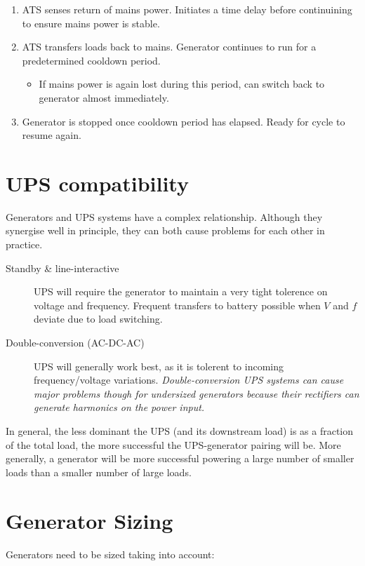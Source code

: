 \documentclass{pgnotes}
\begin{document}
\begin{enumerate}
\item ATS senses return of mains power. Initiates a time delay before continuining to ensure mains power is stable.
\item ATS transfers loads back to mains. Generator continues to run for a predetermined cooldown period.
  \begin{itemize}
  \item If mains power is again lost during this period, can switch back to generator almost immediately.
  \end{itemize}
\item Generator is stopped once cooldown period has elapsed.
  Ready for cycle to resume again.
\end{enumerate}

\section{UPS compatibility}

Generators and UPS systems have a complex relationship.
Although they synergise well in principle, they can both cause problems for each other in practice.

\begin{description}
\item[Standby \& line-interactive] UPS will require the generator to maintain a very tight tolerence on voltage and frequency.
  Frequent transfers to battery possible when $V$ and $f$ deviate due to load switching.
\item[Double-conversion (AC-DC-AC)] UPS will generally work best, as it is tolerent to incoming frequency/voltage variations. \textit{Double-conversion UPS systems can cause major problems though for undersized generators because their rectifiers can generate harmonics on the power input.}
\end{description}

In general, the less dominant the UPS (and its downstream load) is as a fraction of the total load, the more successful the UPS-generator pairing will be.
More generally, a generator will be more successful powering a large number of smaller loads than a smaller number of large loads.

\section{Generator Sizing}

Generators need to be sized taking into account:
\end{document}
